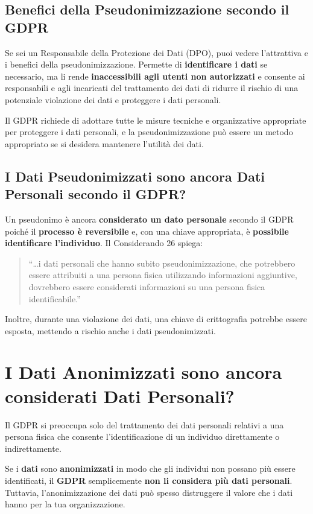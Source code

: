 \subsection{Benefici della Pseudonimizzazione secondo il GDPR}
Se sei un Responsabile della Protezione dei Dati (DPO), puoi vedere l'attrattiva e i benefici della pseudonimizzazione. Permette di\textbf{ identificare i dati }se necessario, ma li rende \textbf{inaccessibili agli utenti non autorizzati} e consente ai responsabili e agli incaricati del trattamento dei dati di ridurre il rischio di una potenziale violazione dei dati e proteggere i dati personali.

Il GDPR richiede di adottare tutte le misure tecniche e organizzative appropriate per proteggere i dati personali, e la pseudonimizzazione può essere un metodo appropriato se si desidera mantenere l'utilità dei dati.

\subsection{I Dati Pseudonimizzati sono ancora Dati Personali secondo il GDPR?}
Un pseudonimo è ancora \textbf{considerato un dato personale} secondo il GDPR poiché il \textbf{processo è reversibile} e, con una chiave appropriata, è \textbf{possibile identificare l'individuo}. Il Considerando 26 spiega:
\begin{quote}
“…i dati personali che hanno subito pseudonimizzazione, che potrebbero essere attribuiti a una persona fisica utilizzando informazioni aggiuntive, dovrebbero essere considerati informazioni su una persona fisica identificabile.”
\end{quote}

Inoltre, durante una violazione dei dati, una chiave di crittografia potrebbe essere esposta, mettendo a rischio anche i dati pseudonimizzati.

\section{I Dati Anonimizzati sono ancora considerati Dati Personali?}
Il GDPR si preoccupa solo del trattamento dei dati personali relativi a una persona fisica che consente l'identificazione di un individuo direttamente o indirettamente.

Se i \textbf{dati} sono\textbf{ anonimizzati} in modo che gli individui non possano più essere identificati, il \textbf{GDPR} semplicemente \textbf{non li considera più dati personali}. Tuttavia, l'anonimizzazione dei dati può spesso distruggere il valore che i dati hanno per la tua organizzazione.